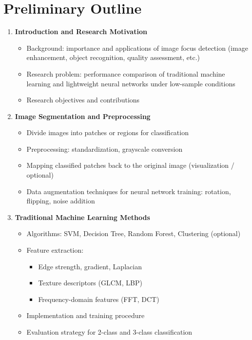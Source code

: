 \section{Preliminary Outline}

\begin{enumerate}
    \item \textbf{Introduction and Research Motivation}
    \begin{itemize}
        \item Background: importance and applications of image focus detection (image enhancement, object recognition, quality assessment, etc.)
        \item Research problem: performance comparison of traditional machine learning and lightweight neural networks under low-sample conditions
        \item Research objectives and contributions
    \end{itemize}

    \item \textbf{Image Segmentation and Preprocessing}
    \begin{itemize}
        \item Divide images into patches or regions for classification
        \item Preprocessing: standardization, grayscale conversion
        \item Mapping classified patches back to the original image (visualization / optional)
        \item Data augmentation techniques for neural network training: rotation, flipping, noise addition
    \end{itemize}

    \item \textbf{Traditional Machine Learning Methods}
    \begin{itemize}
        \item Algorithms: SVM, Decision Tree, Random Forest, Clustering (optional)
        \item Feature extraction:
        \begin{itemize}
            \item Edge strength, gradient, Laplacian
            \item Texture descriptors (GLCM, LBP)
            \item Frequency-domain features (FFT, DCT)
        \end{itemize}
        \item Implementation and training procedure
        \item Evaluation strategy for 2-class and 3-class classification
    \end{itemize}


\end{enumerate}
